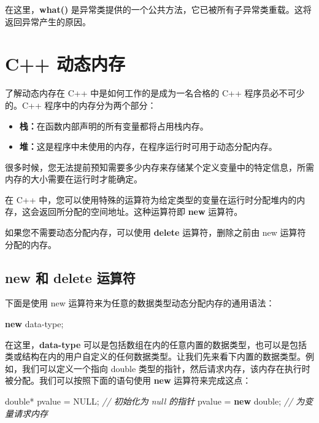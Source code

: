 \documentclass[
]{article}
\newenvironment{Shaded}{}{}
\newcommand{\CommentTok}[1]{\textcolor[rgb]{0.38,0.63,0.69}{\textit{#1}}}
\newcommand{\DataTypeTok}[1]{\textcolor[rgb]{0.56,0.13,0.00}{#1}}
\newcommand{\KeywordTok}[1]{\textcolor[rgb]{0.00,0.44,0.13}{\textbf{#1}}}
\newcommand{\NormalTok}[1]{#1}
\newcommand{\OperatorTok}[1]{\textcolor[rgb]{0.40,0.40,0.40}{#1}}
\providecommand{\tightlist}{%
  \setlength{\itemsep}{0pt}\setlength{\parskip}{0pt}}
\begin{document}
在这里，\textbf{what()}
是异常类提供的一个公共方法，它已被所有子异常类重载。这将返回异常产生的原因。

\hypertarget{c-ux52a8ux6001ux5185ux5b58}{%
\section{C++ 动态内存}\label{c-ux52a8ux6001ux5185ux5b58}}

了解动态内存在 C++ 中是如何工作的是成为一名合格的 C++
程序员必不可少的。C++ 程序中的内存分为两个部分：

\begin{itemize}
\tightlist
\item
  \textbf{栈：}在函数内部声明的所有变量都将占用栈内存。
\item
  \textbf{堆：}这是程序中未使用的内存，在程序运行时可用于动态分配内存。
\end{itemize}

很多时候，您无法提前预知需要多少内存来存储某个定义变量中的特定信息，所需内存的大小需要在运行时才能确定。

在 C++
中，您可以使用特殊的运算符为给定类型的变量在运行时分配堆内的内存，这会返回所分配的空间地址。这种运算符即
\textbf{new} 运算符。

如果您不需要动态分配内存，可以使用 \textbf{delete} 运算符，删除之前由
new 运算符分配的内存。

\hypertarget{new-ux548c-delete-ux8fd0ux7b97ux7b26}{%
\subsection{new 和 delete
运算符}\label{new-ux548c-delete-ux8fd0ux7b97ux7b26}}

下面是使用 new 运算符来为任意的数据类型动态分配内存的通用语法：

\begin{Shaded}
\begin{Highlighting}[]
\KeywordTok{new}\NormalTok{ data}\OperatorTok{{-}}\NormalTok{type}\OperatorTok{;}
\end{Highlighting}
\end{Shaded}

在这里，\textbf{data-type}
可以是包括数组在内的任意内置的数据类型，也可以是包括类或结构在内的用户自定义的任何数据类型。让我们先来看下内置的数据类型。例如，我们可以定义一个指向
double
类型的指针，然后请求内存，该内存在执行时被分配。我们可以按照下面的语句使用
\textbf{new} 运算符来完成这点：

\begin{Shaded}
\begin{Highlighting}[]
\DataTypeTok{double}\OperatorTok{*}\NormalTok{ pvalue  }\OperatorTok{=}\NormalTok{ NULL}\OperatorTok{;} \CommentTok{// 初始化为 null 的指针}
\NormalTok{pvalue  }\OperatorTok{=} \KeywordTok{new} \DataTypeTok{double}\OperatorTok{;}   \CommentTok{// 为变量请求内存}
\end{Highlighting}
\end{Shaded}
\end{document}
